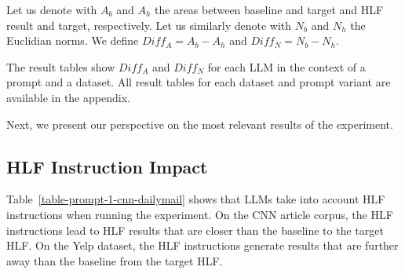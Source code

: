 \documentclass[11pt]{article}
\begin{document}
Let us denote with $A_b$ and $A_h$ the areas between baseline and target and HLF
result and target, respectively.
Let us similarly denote with $N_b$ and $N_h$ the Euclidian norms.
We define $Diff_A = A_b - A_h$ and $Diff_N = N_b - N_h$.

The result tables show $Diff_A$ and $Diff_N$ for each LLM in the context of a
prompt and a dataset.
All result tables for each dataset and prompt variant are available in the
appendix.

Next, we present our perspective on the most relevant results of the experiment.

\subsection{HLF Instruction Impact}

Table~\ref{table-prompt-1-cnn-dailymail} shows that LLMs take into account
HLF instructions when running the experiment.
On the CNN article corpus, the HLF instructions lead to HLF results that are
closer than the baseline to the target HLF.\@
On the Yelp dataset, the HLF instructions generate results that are further away
than the baseline from the target HLF.\@
\end{document}
